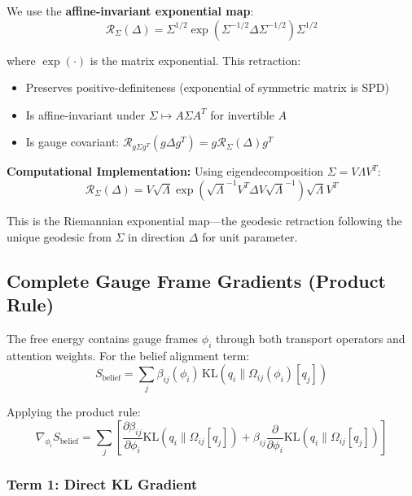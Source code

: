 \documentclass[11pt]{article}
\begin{document}
We use the \textbf{affine-invariant exponential map}:
\begin{equation}
\mathcal{R}_{\Sigma}(\Delta) = \Sigma^{1/2} \exp\left(\Sigma^{-1/2} \Delta \Sigma^{-1/2}\right) \Sigma^{1/2}
\end{equation}

where $\exp(\cdot)$ is the matrix exponential. This retraction:
\begin{itemize}
\item Preserves positive-definiteness (exponential of symmetric matrix is SPD)
\item Is affine-invariant under $\Sigma \mapsto A\Sigma A^T$ for invertible $A$
\item Is gauge covariant: $\mathcal{R}_{g\Sigma g^T}(g\Delta g^T) = g \mathcal{R}_{\Sigma}(\Delta) g^T$
\end{itemize}

\textbf{Computational Implementation:} Using eigendecomposition $\Sigma = V\Lambda V^T$:
\begin{equation}
\mathcal{R}_{\Sigma}(\Delta) = V \sqrt{\Lambda} \exp\left(\sqrt{\Lambda}^{-1} V^T \Delta V \sqrt{\Lambda}^{-1}\right) \sqrt{\Lambda} V^T
\end{equation}

This is the Riemannian exponential map---the geodesic retraction following the unique geodesic from $\Sigma$ in direction $\Delta$ for unit parameter.

\subsection*{Complete Gauge Frame Gradients (Product Rule)}

The free energy contains gauge frames $\phi_i$ through both transport operators and attention weights. For the belief alignment term:
\begin{equation}
S_{\mathrm{belief}} = \sum_j \beta_{ij}(\phi_i) \, \mathrm{KL}(q_i \| \Omega_{ij}(\phi_i)[q_j])
\end{equation}

Applying the product rule:
\begin{equation}
\nabla_{\phi_i} S_{\mathrm{belief}} = \sum_j \left[ \frac{\partial \beta_{ij}}{\partial \phi_i} \mathrm{KL}(q_i \| \Omega_{ij}[q_j]) + \beta_{ij} \frac{\partial}{\partial \phi_i}\mathrm{KL}(q_i \| \Omega_{ij}[q_j]) \right]
\end{equation}

\subsubsection*{Term 1: Direct KL Gradient}
\end{document}
